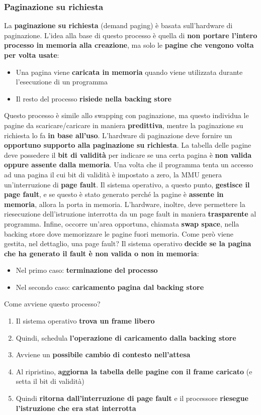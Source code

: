 \documentclass[12pt]{article}
\begin{document}
\subsubsection{Paginazione su richiesta}
La \textbf{paginazione su richiesta} (demand paging) è basata sull'hardware di paginazione.
L'idea alla base di questo processo è quella di \textbf{non portare l'intero processo in memoria alla creazione}, ma solo le \textbf{pagine che vengono volta per volta usate}:
\begin{itemize}
    \item Una pagina viene \textbf{caricata in memoria} quando viene utilizzata durante l'esecuzione di un programma
    \item Il resto del processo \textbf{risiede nella backing store}
\end{itemize}
Questo processo è simile allo swapping con paginazione, ma questo individua le pagine da scaricare/caricare in maniera \textbf{predittiva}, mentre la paginazione su richiesta
lo fa \textbf{in base all'uso}.
L'hardware di paginazione deve fornire un \textbf{opportuno supporto alla paginazione su richiesta}. La tabella delle pagine deve possedere il \textbf{bit di validità} per indicare se una certa
pagina è \textbf{non valida oppure assente dalla memoria}.
Una volta che il programma tenta un accesso ad una pagina il cui bit di validità è impostato a zero, la MMU genera un'interruzione di \textbf{page fault}.
Il sistema operativo, a questo punto, \textbf{gestisce il page fault}, e se questo è stato generato perché la pagine è \textbf{assente in memoria}, allora la porta in memoria.
L'hardware, inoltre, deve permettere la riesecuzione dell'istruzione interrotta da un page fault in maniera \textbf{trasparente} al programma.
Infine, occorre un'area opportuna, chiamata \textbf{swap space}, nella backing store dove memorizzare le pagine fuori memoria.
Come però viene gestita, nel dettaglio, una page fault?
Il sistema operativo \textbf{decide se la pagina che ha generato il fault è non valida o non in memoria}:
\begin{itemize}
    \item Nel primo caso: \textbf{terminazione del processo}
    \item Nel secondo caso: \textbf{caricamento pagina dal backing store}
\end{itemize}
Come avviene questo processo?
\begin{enumerate}
    \item Il sistema operativo \textbf{trova un frame libero}
    \item Quindi, schedula \textbf{l'operazione di caricamento dalla backing store}
    \item Avviene un \textbf{possibile cambio di contesto nell'attesa}
    \item Al ripristino, \textbf{aggiorna la tabella delle pagine con il frame caricato} (e setta il bit di validità)
    \item Quindi \textbf{ritorna dall'interruzione di page fault} e il processore \textbf{riesegue l'istruzione che era stat interrotta}
\end{enumerate}
\end{document}
